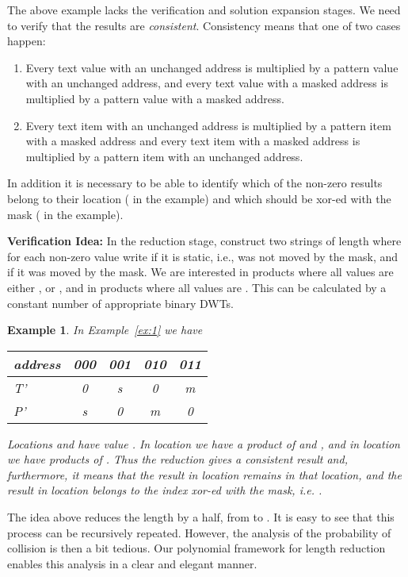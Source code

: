 \documentclass[11pt,amssymb]{article}
\newtheorem{example}{Example}
\begin{document}
The above example lacks the verification and solution expansion
stages. We need to verify that the results are {\em
  consistent}. Consistency means that one of two cases happen:
\begin{enumerate}
\item Every text value with an unchanged address is multiplied by a
pattern value with an unchanged address, and every text value with a
masked address is multiplied by a pattern value with a masked address. 
\item Every text item with an unchanged address is multiplied by a
  pattern item with a masked address and every text item with a masked
  address is multiplied by a pattern item with an unchanged address.
\end{enumerate}

In addition it is necessary to be able to identify which of the non-zero
results belong to their location ( in the example) and which should
be xor-ed with the mask ( in the example).

{\bf Verification Idea:} In the reduction stage, construct two strings
of length  where for each non-zero value write  if it
is static, i.e., was not moved by the mask, and  if it was moved by
the mask. We are interested in products where all values are either , or , and in products where all values are
. This can be calculated by a constant number of
appropriate binary DWTs.

\begin{example}\label{ex:2}
In Example~\ref{ex:1} we have

\begin{tabular}{|l|c|c|c|c|}
\hline
address & 000 & 001 & 010 & 011 \\
\hline\hline
T' & 0 & s & 0 & m\\
\hline
P' & s & 0 & m & 0\\
\hline
\end{tabular}

Locations  and  have value .
In location  we have a product of  and , and
in location  we have products of . Thus the reduction
gives a consistent result and, furthermore, it means that the result
in location  remains in that location, and the result in location
 belongs to the index xor-ed with the mask, i.e. .
 
\end{example}

The idea above reduces the length by a half, from  to
. It is easy to see that this process can be recursively
repeated. However, the analysis of the probability of collision is
then a bit tedious. Our polynomial framework for length reduction
enables this analysis in a clear and elegant manner.
\end{document}
